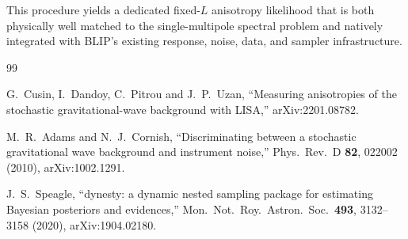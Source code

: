 \documentclass[11pt]{article}
\begin{document}
This procedure yields a dedicated fixed-$L$ anisotropy likelihood that is both physically well matched to the single-multipole spectral problem and natively integrated with BLIP's existing response, noise, data, and sampler infrastructure.

\begin{thebibliography}{99}

G.~Cusin, I.~Dandoy, C.~Pitrou and J.~P.~Uzan,
``Measuring anisotropies of the stochastic gravitational-wave background with LISA,''
arXiv:2201.08782.

M.~R.~Adams and N.~J.~Cornish,
``Discriminating between a stochastic gravitational wave background and instrument noise,''
Phys.\ Rev.\ D {\bf 82}, 022002 (2010),
arXiv:1002.1291.

J.~S.~Speagle,
``dynesty: a dynamic nested sampling package for estimating Bayesian posteriors and evidences,''
Mon.\ Not.\ Roy.\ Astron.\ Soc.\ {\bf 493}, 3132--3158 (2020),
arXiv:1904.02180.

\end{thebibliography}
\end{document}
